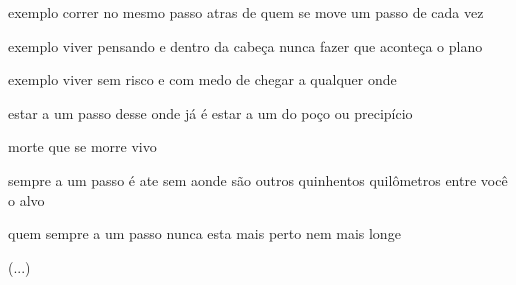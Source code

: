 \begin{poem}
\begin{stanza}
exemplo\verseline
correr no mesmo\verseline
passo atras de quem\verseline
se move um passo\verseline
de cada vez
\end{stanza}
\begin{stanza}
exemplo\verseline
viver pensando e\verseline
dentro da cabeça\verseline
\qquad nunca fazer\verseline
\qquad que aconteça\verseline
\qquad o plano
\end{stanza}
\begin{stanza}
exemplo\verseline
viver sem risco e\verseline
com medo de chegar\verseline
a qualquer onde
\end{stanza}
\begin{stanza}
estar a um passo\verseline
desse onde já é\verseline
estar a um\verseline
do poço\verseline
ou precipício
\end{stanza}
\begin{stanza}
morte que se morre\verseline
vivo
\end{stanza}
\begin{stanza}
sempre a um passo\verseline
é ate sem aonde\verseline
\qquad são outros quinhentos\verseline
\qquad quilômetros entre\verseline
\qquad você o alvo
\end{stanza}
\begin{stanza}
quem sempre a um passo\verseline
nunca esta mais perto\verseline
nem mais longe
\end{stanza}
\begin{stanza}
(...)
\end{stanza}
\end{poem}